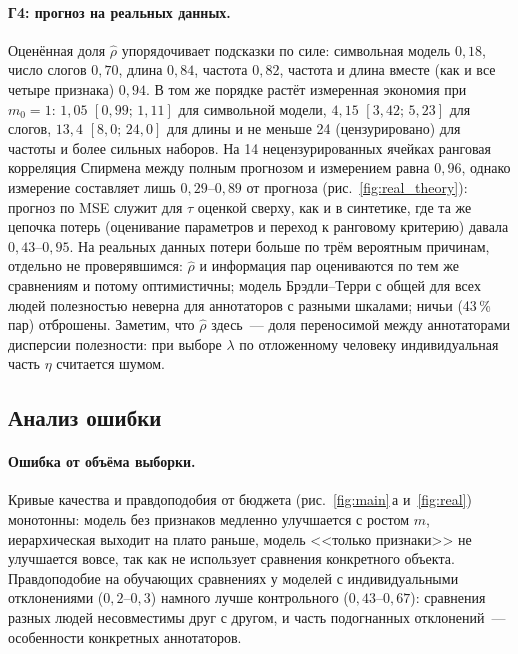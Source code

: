 \documentclass{article}
\theoremstyle{definition}
\theoremstyle{remark}
\begin{document}
\paragraph{Г4: прогноз на реальных данных.}
Оценённая доля $\hat\rho$ упорядочивает подсказки по силе: символьная модель $0{,}18$, число слогов $0{,}70$, длина $0{,}84$, частота $0{,}82$, частота и длина вместе (как и все четыре признака) $0{,}94$. В том же порядке растёт измеренная экономия при $m_0=1$: $1{,}05$ $[0{,}99;\,1{,}11]$ для символьной модели, $4{,}15$ $[3{,}42;\,5{,}23]$ для слогов, $13{,}4$ $[8{,}0;\,24{,}0]$ для длины и не меньше 24 (цензурировано) для частоты и более сильных наборов. На 14 нецензурированных ячейках ранговая корреляция Спирмена между полным прогнозом и измерением равна $0{,}96$, однако измерение составляет лишь $0{,}29$--$0{,}89$ от прогноза (рис.~\ref{fig:real_theory}): прогноз по MSE служит для $\tau$ оценкой сверху, как и в синтетике, где та же цепочка потерь (оценивание параметров и переход к ранговому критерию) давала $0{,}43$--$0{,}95$. На реальных данных потери больше по трём вероятным причинам, отдельно не проверявшимся: $\hat\rho$ и информация пар оцениваются по тем же сравнениям и потому оптимистичны; модель Брэдли--Терри с общей для всех людей полезностью неверна для аннотаторов с разными шкалами; ничьи (43\,\% пар) отброшены. Заметим, что $\hat\rho$ здесь~--- доля переносимой между аннотаторами дисперсии полезности: при выборе $\lambda$ по отложенному человеку индивидуальная часть $\eta$ считается шумом.

\subsection{Анализ ошибки}

\paragraph{Ошибка от объёма выборки.}
Кривые качества и правдоподобия от бюджета (рис.~\ref{fig:main}\,а и~\ref{fig:real}) монотонны: модель без признаков медленно улучшается с ростом $m$, иерархическая выходит на плато раньше, модель <<только признаки>> не улучшается вовсе, так как не использует сравнения конкретного объекта. Правдоподобие на обучающих сравнениях у моделей с индивидуальными отклонениями ($0{,}2$--$0{,}3$) намного лучше контрольного ($0{,}43$--$0{,}67$): сравнения разных людей несовместимы друг с другом, и часть подогнанных отклонений~--- особенности конкретных аннотаторов.
\end{document}

